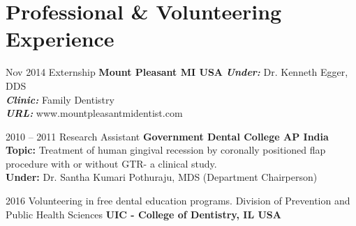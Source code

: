 \documentclass[]{friggeri-cv} %
\begin{document}
\section{Professional \& Volunteering Experience}
\begin{entrylist}
\entry
{Nov 2014}
{Externship}
{\bf Mount Pleasant MI USA}
{
	\emph{\bf Under: } Dr. Kenneth Egger, DDS\\
	\emph{\bf Clinic: } Family Dentistry\\
	\emph{\bf URL: }www.mountpleasantmidentist.com
}

\entry
{2010 -- 2011}
{Research Assistant}
{\bf Government Dental College AP India}
{
	{\bf Topic: } Treatment of human gingival recession by coronally positioned flap procedure with or without GTR- a clinical study.\\
	{\bf Under: } Dr. Santha Kumari Pothuraju, MDS (Department Chairperson)\\
}

\entry
{2016}
{Volunteering in free dental education programs. Division of Prevention and Public Health Sciences}
{\bf UIC - College of Dentistry, IL USA}




\end{entrylist}
\end{document}
